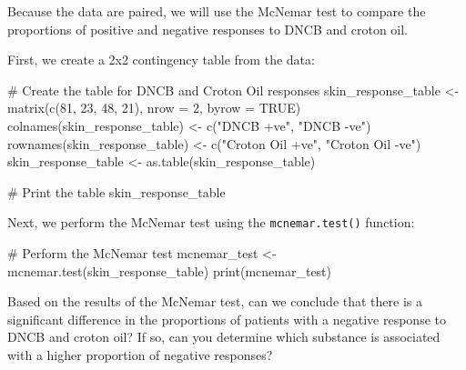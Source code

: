 \documentclass[
  letterpaper,
  DIV=11,
  numbers=noendperiod]{scrartcl}
\newenvironment{Shaded}{\begin{snugshade}}{\end{snugshade}}
\newcommand{\AttributeTok}[1]{\textcolor[rgb]{0.40,0.45,0.13}{#1}}
\newcommand{\CommentTok}[1]{\textcolor[rgb]{0.37,0.37,0.37}{#1}}
\newcommand{\ConstantTok}[1]{\textcolor[rgb]{0.56,0.35,0.01}{#1}}
\newcommand{\DecValTok}[1]{\textcolor[rgb]{0.68,0.00,0.00}{#1}}
\newcommand{\FunctionTok}[1]{\textcolor[rgb]{0.28,0.35,0.67}{#1}}
\newcommand{\NormalTok}[1]{\textcolor[rgb]{0.00,0.23,0.31}{#1}}
\newcommand{\OtherTok}[1]{\textcolor[rgb]{0.00,0.23,0.31}{#1}}
\newcommand{\StringTok}[1]{\textcolor[rgb]{0.13,0.47,0.30}{#1}}
\begin{document}
Because the data are paired, we will use the McNemar test to compare the
proportions of positive and negative responses to DNCB and croton oil.

First, we create a 2x2 contingency table from the data:

\begin{Shaded}
\begin{Highlighting}[]
\CommentTok{\# Create the table for DNCB and Croton Oil responses}
\NormalTok{skin\_response\_table }\OtherTok{\textless{}{-}} \FunctionTok{matrix}\NormalTok{(}\FunctionTok{c}\NormalTok{(}\DecValTok{81}\NormalTok{, }\DecValTok{23}\NormalTok{, }\DecValTok{48}\NormalTok{, }\DecValTok{21}\NormalTok{), }\AttributeTok{nrow =} \DecValTok{2}\NormalTok{, }\AttributeTok{byrow =} \ConstantTok{TRUE}\NormalTok{)}
\FunctionTok{colnames}\NormalTok{(skin\_response\_table) }\OtherTok{\textless{}{-}} \FunctionTok{c}\NormalTok{(}\StringTok{"DNCB +ve"}\NormalTok{, }\StringTok{"DNCB {-}ve"}\NormalTok{)}
\FunctionTok{rownames}\NormalTok{(skin\_response\_table) }\OtherTok{\textless{}{-}} \FunctionTok{c}\NormalTok{(}\StringTok{"Croton Oil +ve"}\NormalTok{, }\StringTok{"Croton Oil {-}ve"}\NormalTok{)}
\NormalTok{skin\_response\_table }\OtherTok{\textless{}{-}} \FunctionTok{as.table}\NormalTok{(skin\_response\_table)}

\CommentTok{\# Print the table}
\NormalTok{skin\_response\_table}
\end{Highlighting}
\end{Shaded}

Next, we perform the McNemar test using the \texttt{mcnemar.test()}
function:

\begin{Shaded}
\begin{Highlighting}[]
\CommentTok{\# Perform the McNemar test}
\NormalTok{mcnemar\_test }\OtherTok{\textless{}{-}} \FunctionTok{mcnemar.test}\NormalTok{(skin\_response\_table)}
\FunctionTok{print}\NormalTok{(mcnemar\_test)}
\end{Highlighting}
\end{Shaded}

\begin{tcolorbox}[enhanced jigsaw, bottomrule=.15mm, coltitle=black, colbacktitle=quarto-callout-important-color!10!white, left=2mm, bottomtitle=1mm, breakable, colframe=quarto-callout-important-color-frame, toprule=.15mm, titlerule=0mm, title={Question 14}, opacitybacktitle=0.6, arc=.35mm, rightrule=.15mm, opacityback=0, leftrule=.75mm, toptitle=1mm, colback=white]

Based on the results of the McNemar test, can we conclude that there is
a significant difference in the proportions of patients with a negative
response to DNCB and croton oil? If so, can you determine which
substance is associated with a higher proportion of negative responses?

\end{tcolorbox}
\end{document}
